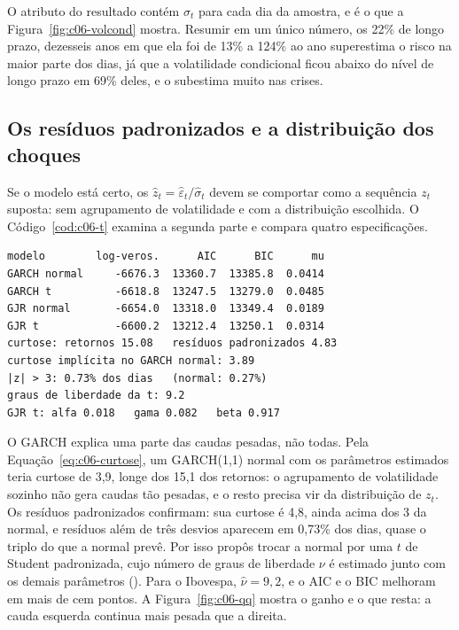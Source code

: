 O atributo  do resultado contém $\sigma_t$ para cada dia da amostra, e é o que a Figura~\ref{fig:c06-volcond} mostra. Resumir em um único número, os 22\% de longo prazo, dezesseis anos em que ela foi de 13\% a 124\% ao ano superestima o risco na maior parte dos dias, já que a volatilidade condicional ficou abaixo do nível de longo prazo em 69\% deles, e o subestima muito nas crises.

\subsection{Os resíduos padronizados e a distribuição dos choques}

Se o modelo está certo, os  $\hat z_t = \hat\varepsilon_t / \hat\sigma_t$ devem se comportar como a sequência $z_t$ suposta: sem agrupamento de volatilidade e com a distribuição escolhida. O Código~\ref{cod:c06-t} examina a segunda parte e compara quatro especificações.

\Needspace{32mm}

\Needspace{46mm}
\begin{lstlisting}[style=saida]
modelo        log-veros.      AIC      BIC      mu
GARCH normal     -6676.3  13360.7  13385.8  0.0414
GARCH t          -6618.8  13247.5  13279.0  0.0485
GJR normal       -6654.0  13318.0  13349.4  0.0189
GJR t            -6600.2  13212.4  13250.1  0.0314
curtose: retornos 15.08   resíduos padronizados 4.83
curtose implícita no GARCH normal: 3.89
|z| > 3: 0.73% dos dias   (normal: 0.27%)
graus de liberdade da t: 9.2
GJR t: alfa 0.018   gama 0.082   beta 0.917
\end{lstlisting}

O GARCH explica uma parte das caudas pesadas, não todas. Pela Equação~\eqref{eq:c06-curtose}, um GARCH(1,1) normal com os parâmetros estimados teria curtose de 3,9, longe dos 15,1 dos retornos: o agrupamento de volatilidade sozinho não gera caudas tão pesadas, e o resto precisa vir da distribuição de $z_t$. Os resíduos padronizados confirmam: sua curtose é 4,8, ainda acima dos 3 da normal, e resíduos além de três desvios aparecem em 0,73\% dos dias, quase o triplo do que a normal prevê. Por isso \citet{bollerslev1987} propôs trocar a normal por uma $t$ de Student padronizada, cujo número de graus de liberdade $\nu$ é estimado junto com os demais parâmetros (). Para o Ibovespa, $\hat\nu = 9,2$, e o AIC e o BIC melhoram em mais de cem pontos. A Figura~\ref{fig:c06-qq} mostra o ganho e o que resta: a cauda esquerda continua mais pesada que a direita.


